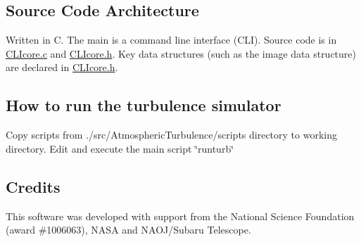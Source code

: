 \subsection*{Source Code Architecture}

Written in C. The main is a command line interface (C\+L\+I). Source code is in \hyperlink{CLIcore_8c}{C\+L\+Icore.\+c} and \hyperlink{CLIcore_8h}{C\+L\+Icore.\+h}. Key data structures (such as the image data structure) are declared in \hyperlink{CLIcore_8h}{C\+L\+Icore.\+h}.

\subsection*{How to run the turbulence simulator}

Copy scripts from ./src/\+Atmospheric\+Turbulence/scripts directory to working directory. Edit and execute the main script \char`\"{}runturb\char`\"{}

\subsection*{Credits}

This software was developed with support from the National Science Foundation (award \#1006063), N\+A\+S\+A and N\+A\+O\+J/\+Subaru Telescope. 